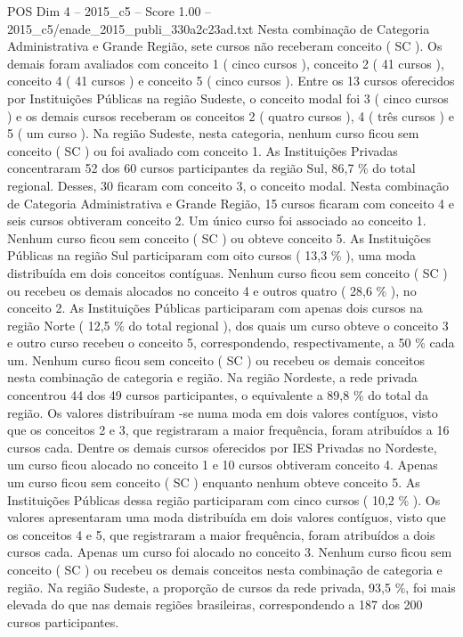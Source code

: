 \begin{textsample}{POS Dim 4 – 2015\_c5 – Score 1.00 – 2015\_c5/enade\_2015\_publi\_330a2c23ad.txt}
Nesta combinação de Categoria Administrativa e Grande Região, sete cursos não receberam conceito ( SC ).
Os demais foram avaliados com conceito 1 ( cinco cursos ), conceito 2 ( 41 cursos ), conceito 4 ( 41 cursos ) e conceito 5 ( cinco cursos ).
Entre os 13 cursos oferecidos por Instituições Públicas na região Sudeste, o conceito modal foi 3 ( cinco cursos ) e os demais cursos receberam os conceitos 2 ( quatro cursos ), 4 ( três cursos ) e 5 ( um curso ).
Na região Sudeste, nesta categoria, nenhum curso ficou sem conceito ( SC ) ou foi avaliado com conceito 1.
As Instituições Privadas concentraram 52 dos 60 cursos participantes da região Sul, 86,7 \% do total regional.
Desses, 30 ficaram com conceito 3, o conceito modal.
Nesta combinação de Categoria Administrativa e Grande Região, 15 cursos ficaram com conceito 4 e seis cursos obtiveram conceito 2.
Um único curso foi associado ao conceito 1.
Nenhum curso ficou sem conceito ( SC ) ou obteve conceito 5.
As Instituições Públicas na região Sul participaram com oito cursos ( 13,3 \% ), uma moda distribuída em dois conceitos contíguas.
Nenhum curso ficou sem conceito ( SC ) ou recebeu os demais alocados no conceito 4 e outros quatro ( 28,6 \% ), no conceito 2.
As Instituições Públicas participaram com apenas dois cursos na região Norte ( 12,5 \% do total regional ), dos quais um curso obteve o conceito 3 e outro curso recebeu o conceito 5, correspondendo, respectivamente, a 50 \% cada um.
Nenhum curso ficou sem conceito ( SC ) ou recebeu os demais conceitos nesta combinação de categoria e região.
Na região Nordeste, a rede privada concentrou 44 dos 49 cursos participantes, o equivalente a 89,8 \% do total da região.
Os valores distribuíram -se numa moda em dois valores contíguos, visto que os conceitos 2 e 3, que registraram a maior frequência, foram atribuídos a 16 cursos cada.
Dentre os demais cursos oferecidos por IES Privadas no Nordeste, um curso ficou alocado no conceito 1 e 10 cursos obtiveram conceito 4.
Apenas um curso ficou sem conceito ( SC ) enquanto nenhum obteve conceito 5.
As Instituições Públicas dessa região participaram com cinco cursos ( 10,2 \% ).
Os valores apresentaram uma moda distribuída em dois valores contíguos, visto que os conceitos 4 e 5, que registraram a maior frequência, foram atribuídos a dois cursos cada.
Apenas um curso foi alocado no conceito 3.
Nenhum curso ficou sem conceito ( SC ) ou recebeu os demais conceitos nesta combinação de categoria e região.
Na região Sudeste, a proporção de cursos da rede privada, 93,5 \%, foi mais elevada do que nas demais regiões brasileiras, correspondendo a 187 dos 200 cursos participantes.

\end{textsample}
